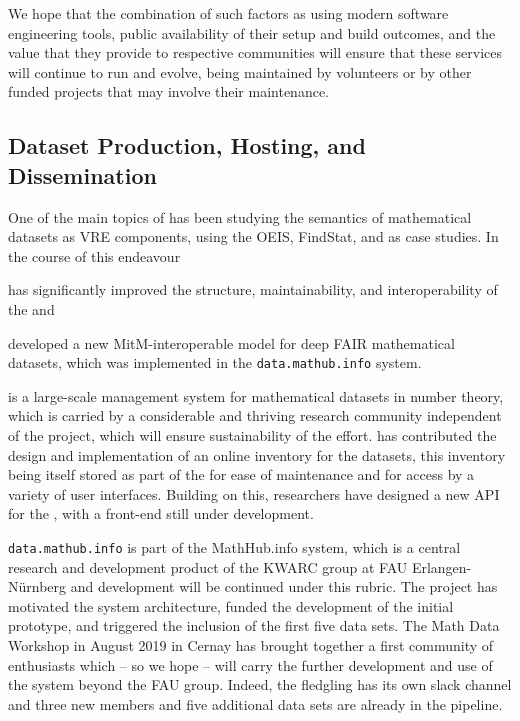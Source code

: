 \documentclass{deliverablereport}
\def\dmh{\texttt{data.mathub.info}\xspace}
\begin{document}
We hope that the combination of such factors as using modern
software engineering tools, public availability of their
setup and build outcomes, and the value that they provide to
respective communities will ensure that these services will
continue to run and evolve, being maintained by volunteers
or by other funded projects that may involve their maintenance.

\subsection{Dataset Production, Hosting, and Dissemination}

One of the main topics of  has been studying the semantics of mathematical
datasets as VRE components, using the OEIS, FindStat, and \LMFDB as case studies. In the
course of this endeavour \pn
\begin{compactenum}
\item has significantly improved the structure, maintainability, and interoperability of
  the \LMFDB and
\item developed a new MitM-interoperable model for deep FAIR mathematical datasets, which
  was implemented in the \dmh system.
\end{compactenum}
\LMFDB is a large-scale management system for mathematical datasets in number theory, which
is carried by a considerable and thriving research community independent of the \pn
project, which will ensure sustainability of the effort.
\pn has contributed the design and implementation of an online inventory for the \LMFDB datasets,
this inventory being itself stored as part of the \LMFDB for ease of maintenance and for access by a variety of user interfaces.
Building on this, \ODK researchers have designed a new API for the \LMFDB, with a \Sage front-end still under development.




\dmh is part of the MathHub.info system, which is a central research and development
product of the KWARC group at FAU Erlangen-N\"urnberg and development will be continued
under this rubric.
The \pn project has motivated the system architecture, funded the development of the
initial prototype, and triggered the inclusion of the first five data sets.
The Math Data Workshop in August 2019 in Cernay has brought together a first community of
enthusiasts which -- so we hope -- will carry the further development and use of the system
beyond the FAU group.
Indeed, the fledgling has its own slack channel and three new members and five additional
data sets are already in the pipeline.
\end{document}
